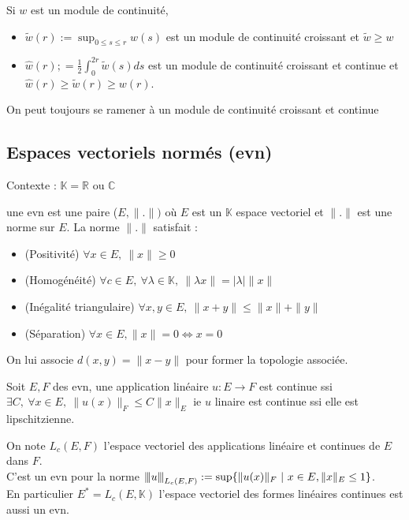\begin{remarque}
    Si $w$ est un module de continuité,
    \begin{itemize}
        \item $\tilde{w}(r):=\sup_{0\le s\le r} w(s)$ est un module de continuité croissant et $\tilde w\ge w$
        \item $\hat{w}(r);=\frac{1}{2} \int_0^{2r}\tilde{w}(s)ds$ est un module de continuité croissant et continue et $\hat{w}(r)\ge \tilde{w}(r)\ge w(r)$.
    \end{itemize}

    On peut toujours se ramener à un module de continuité croissant et continue
\end{remarque}

\subsection{Espaces vectoriels normés (evn)}
\noindent Contexte : $\mathbb{K}=\mathbb{R}$ ou $\mathbb{C}$
\begin{definition}
    une evn est une paire ($E,\|.\|)$ où $E$ est un $\mathbb{K}$ espace vectoriel et $\|.\|$ est une norme sur $E$. La norme $\|.\|$ satisfait :
    \begin{itemize}
        \item (Positivité) $\forall x\in E,\ \|x\|\ge 0$
        \item (Homogénéité) $\forall c\in E,\ \forall  \lambda\in \mathbb{K},\ \|\lambda x\|=|\lambda|\|x\|$
        \item (Inégalité triangulaire) $\forall x,y \in E,\ \|x+y\|\le \|x\|+\|y\|$
        \item (Séparation) $\forall x \in E, \|x\| = 0 \Leftrightarrow x = 0$
    \end{itemize}
\end{definition}

On lui associe $d(x,y)=\|x-y\|$ pour former la topologie associée.

\begin{propriete}
    Soit $E,F$ des evn, une application linéaire $u:E\to F$ est continue ssi $\exists C,\ \forall x\in E,\ \|u(x)\|_F\le C\|x\|_E$ ie $u$ linaire est continue ssi elle est lipschitzienne.
\end{propriete}

On note $L_c(E,F)$ l'espace vectoriel des applications linéaire et continues de $E$ dans $F$.\\
C'est un evn pour la norme ${\left\vert\kern-0.25ex\left\vert\kern-0.25ex\left\vert u \right\vert\kern-0.25ex\right\vert\kern-0.25ex\right\vert}_{L_c(E,F)}:=\sup\{\|u(x)\|_F\ |\ x\in E, \|x\|_E\le 1\} $. \\
En particulier $E^*=L_c(E,\mathbb{K})$ l'espace vectoriel des formes linéaires continues est aussi un evn.

